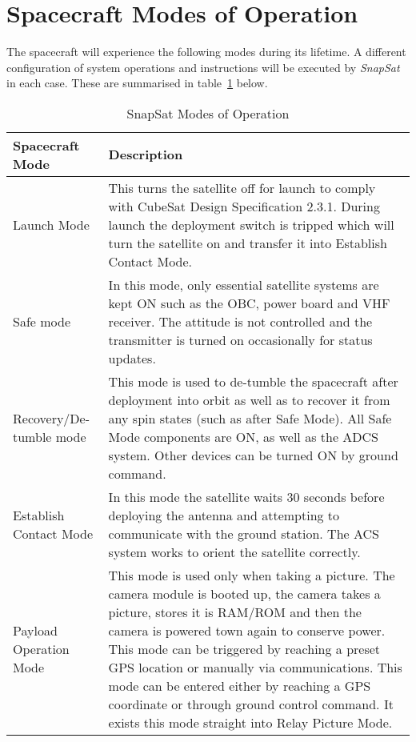 \section{Spacecraft Modes of Operation}
The spacecraft will experience the following modes during its lifetime. A different configuration of system operations and instructions will be executed by \textit{SnapSat} in each case. These are summarised in table~\ref{tab:modesofoperation} below.

\begin{table}[H]
    \centering
    \caption{SnapSat Modes of Operation}
    \vspace{0.15cm}
    \label{tab:modesofoperation}
    {\renewcommand{\arraystretch}{1.3}%
        \begin{tabular}{|>{\raggedright\let\newline\\\arraybackslash\hspace{0pt}}m{3cm}|>{\arraybackslash}m{12.5cm}|}
            \hline
            \textbf{Spacecraft Mode} & \textbf{Description} \\ \hline\hline
            Launch Mode &  This turns the satellite off for launch to comply with CubeSat Design Specification 2.3.1. During launch the deployment switch is tripped which will turn the satellite on and transfer it into Establish Contact Mode.
            \\\hline
            Safe mode & In this mode, only essential satellite systems are kept ON such as the OBC, power board and VHF receiver. The attitude is not controlled and the transmitter is turned on occasionally for status updates.  
             \\\hline
            Recovery/De-tumble mode & This mode is used to de-tumble the spacecraft after deployment into orbit as well as to recover it from any spin states (such as after Safe Mode). All Safe Mode components are ON, as well as the ADCS system. Other devices can be turned ON by ground command.  
            \\\hline
			Establish Contact Mode & In this mode the satellite waits 30 seconds before deploying the antenna and attempting to communicate with the ground station. The ACS system works to orient the satellite correctly.
            \\\hline
            Payload Operation Mode & This mode is used only when taking a picture.  The camera module is booted up, the camera takes a picture, stores it is RAM/ROM and then the camera is powered town again to conserve power.  This mode can be triggered by reaching a preset GPS location or manually via communications.  This mode can be entered either by reaching a GPS coordinate or through ground control command.  It exists this mode straight into Relay Picture Mode.

\end{tabular}}
\end{table}
